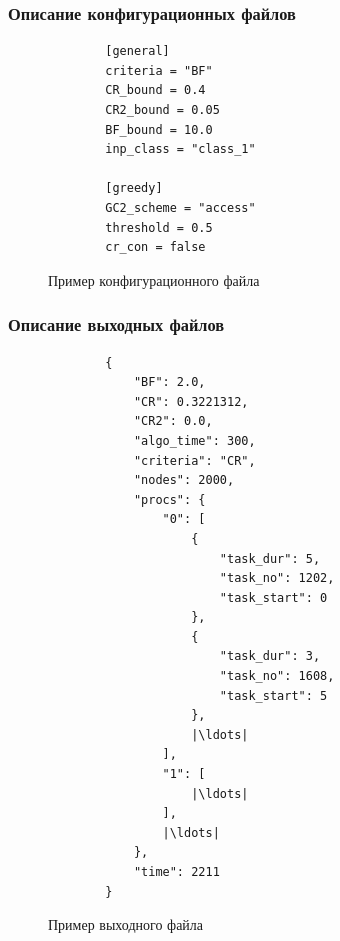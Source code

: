 \subsubsection{Описание конфигурационных файлов}
\begin{figure}[!ht]
    \begin{verbatim}
        [general] 
        criteria = "BF" 
        CR_bound = 0.4 
        CR2_bound = 0.05 
        BF_bound = 10.0 
        inp_class = "class_1" 
        
        [greedy] 
        GC2_scheme = "access" 
        threshold = 0.5 
        cr_con = false
    \end{verbatim}
    \caption{Пример конфигурационного файла}    
\end{figure}

\subsubsection{Описание выходных файлов}
\begin{figure}[H]
    \begin{verbatim}
        { 
            "BF": 2.0, 
            "CR": 0.3221312, 
            "CR2": 0.0, 
            "algo_time": 300, 
            "criteria": "CR", 
            "nodes": 2000, 
            "procs": { 
                "0": [ 
                    { 
                        "task_dur": 5, 
                        "task_no": 1202, 
                        "task_start": 0 
                    }, 
                    { 
                        "task_dur": 3, 
                        "task_no": 1608, 
                        "task_start": 5 
                    },
                    |\ldots|
                ], 
                "1": [ 
                    |\ldots|
                ], 
                |\ldots|
            }, 
            "time": 2211 
        }
    \end{verbatim}
    \caption{Пример выходного файла}    
\end{figure}

